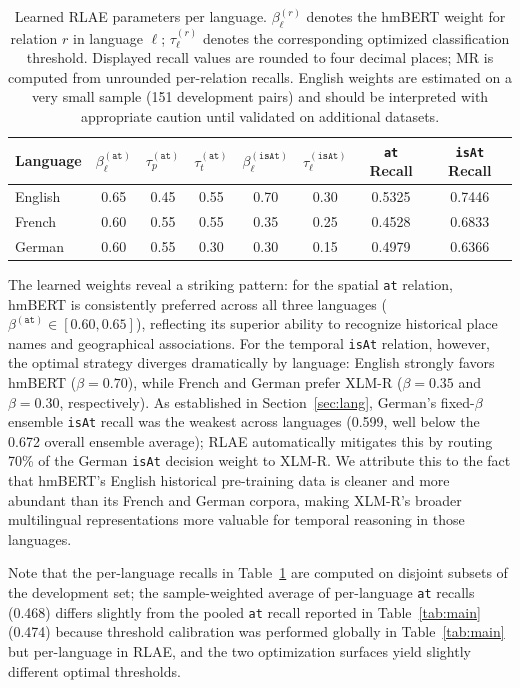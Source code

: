 \documentclass[11pt,a4paper]{article}
\begin{document}
\begin{table}[t]
\centering
\caption{Learned RLAE parameters per language. $\beta^{(r)}_\ell$ denotes the hmBERT weight for relation $r$ in language $\ell$; $\tau^{(r)}_\ell$ denotes the corresponding optimized classification threshold. Displayed recall values are rounded to four decimal places; MR is computed from unrounded per-relation recalls. English weights are estimated on a very small sample (151 development pairs) and should be interpreted with appropriate caution until validated on additional datasets.}
\label{tab:rlae}
\begin{tabular}{lccccccc}
\toprule
\textbf{Language} & $\beta^{(\texttt{at})}_\ell$ & $\tau_{p}^{(\texttt{at})}$ & $\tau_{t}^{(\texttt{at})}$ & $\beta^{(\texttt{isAt})}_\ell$ & $\tau^{(\texttt{isAt})}_\ell$ & \textbf{\texttt{at} Recall} & \textbf{\texttt{isAt} Recall} \\
\midrule
English & 0.65 & 0.45 & 0.55 & 0.70 & 0.30 & 0.5325 & 0.7446 \\
French & 0.60 & 0.55 & 0.55 & 0.35 & 0.25 & 0.4528 & 0.6833 \\
German & 0.60 & 0.55 & 0.30 & 0.30 & 0.15 & 0.4979 & 0.6366 \\
\bottomrule
\end{tabular}
\end{table}

The learned weights reveal a striking pattern: for the spatial \texttt{at} relation, hmBERT is consistently preferred across all three languages ($\beta^{(\texttt{at})} \in [0.60, 0.65]$), reflecting its superior ability to recognize historical place names and geographical associations. For the temporal \texttt{isAt} relation, however, the optimal strategy diverges dramatically by language: English strongly favors hmBERT ($\beta=0.70$), while French and German prefer XLM-R ($\beta=0.35$ and $\beta=0.30$, respectively). As established in Section~\ref{sec:lang}, German's fixed-$\beta$ ensemble \texttt{isAt} recall was the weakest across languages (0.599, well below the 0.672 overall ensemble average); RLAE automatically mitigates this by routing 70\% of the German \texttt{isAt} decision weight to XLM-R. We attribute this to the fact that hmBERT's English historical pre-training data is cleaner and more abundant than its French and German corpora, making XLM-R's broader multilingual representations more valuable for temporal reasoning in those languages.

Note that the per-language recalls in Table~\ref{tab:rlae} are computed on disjoint subsets of the development set; the sample-weighted average of per-language \texttt{at} recalls (0.468) differs slightly from the pooled \texttt{at} recall reported in Table~\ref{tab:main} (0.474) because threshold calibration was performed globally in Table~\ref{tab:main} but per-language in RLAE, and the two optimization surfaces yield slightly different optimal thresholds.
\end{document}
